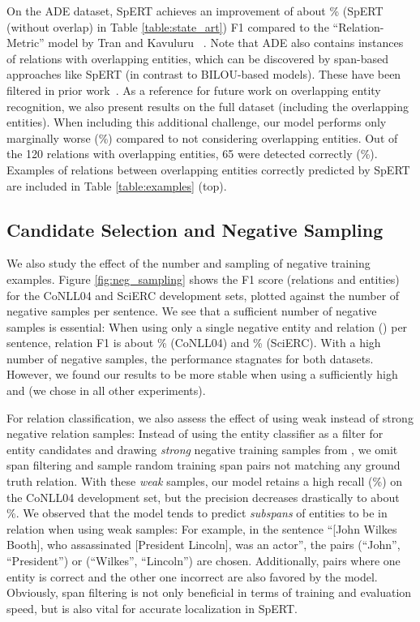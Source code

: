 \documentclass{ecai}
\begin{document}
On the ADE dataset, SpERT achieves an improvement of about \% (SpERT (without overlap) in Table \ref{table:state_art}) F1 compared to the \enquote{Relation-Metric} model by Tran and Kavuluru ~\cite{tran:2019:metric_learning}. Note that ADE also contains  instances of relations with overlapping entities, which can be discovered by span-based approaches like SpERT (in contrast to BILOU-based models). These have been filtered in prior work~\cite{bekoulis:2018:multi_head,li:2017:joint_bio,tran:2019:metric_learning}.
As a reference for future work on overlapping entity recognition, we also present results on the full dataset (including the overlapping entities). When including this additional challenge, our model performs only marginally worse (\%) compared to not considering overlapping entities. Out of the 120 relations with overlapping entities, 65 were detected correctly (\%). Examples of relations between overlapping entities correctly predicted by SpERT are included in Table \ref{table:examples} (top).

\subsection{Candidate Selection and Negative Sampling}

We also study the effect of the number and sampling of negative training examples. Figure \ref{fig:neg_sampling} shows the F1 score (relations and entities) for the CoNLL04 and SciERC development sets, plotted against the number of negative samples  per sentence. We see that a sufficient number of negative samples is essential: When using only a single negative entity and relation () per sentence, relation F1 is about \% (CoNLL04) and \% (SciERC). With a high number of negative samples, the performance stagnates for both datasets. However, we found our results to be more stable when using a sufficiently high  and  (we chose  in all other experiments).


For relation classification, we also assess the effect of using weak instead of strong negative relation samples: Instead of using the entity classifier as a filter for entity candidates  and drawing {\it strong} negative training samples from , we omit span filtering and sample random training span pairs not matching any ground truth relation. 
With these {\it weak} samples, our model retains a high recall (\%) on the CoNLL04 development set, but the precision decreases drastically to about \%. We observed that the model tends to predict {\it subspans} of entities to be in relation when using weak samples: For example, in the sentence \enquote{[John Wilkes Booth], who assassinated [President Lincoln], was an actor}, the pairs (\enquote{John}, \enquote{President}) or (\enquote{Wilkes}, \enquote{Lincoln}) are chosen. Additionally, pairs where one entity is correct and the other one incorrect are also favored by the model. Obviously, span filtering is not only beneficial in terms of training and evaluation speed, but is also vital for accurate localization in SpERT.
\end{document}
